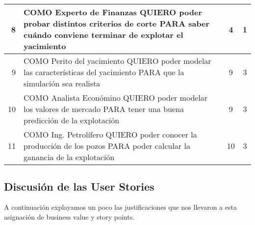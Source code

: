 \begin{center}
\begin{tabular}{| r | p{10cm} | c | c | }
    8 & COMO Experto de Finanzas QUIERO poder probar distintos criterios de corte PARA saber 
    cuándo conviene terminar de explotar el yacimiento & 4 & 1\\ \hline
    
    9 & COMO Perito del yacimiento QUIERO poder modelar las características del yacimiento PARA 
    que la simulación sea realista & 9 & 3\\ \hline
    
    10 & COMO Analista Económino QUIERO poder modelar los valores de mercado PARA 
    tener una buena predicción de la explotación & 9 & 3\\ \hline
    
    11 & COMO Ing. Petrolífero QUIERO poder conocer la producción de los pozos PARA poder calcular 
    la ganancia de la explotación & 10 & 3\\ \hline
    
  \end{tabular}
\end{center}

\subsection{Discusión de las User Stories}

A continuación explayamos un poco las justificaciones que nos llevaron a esta asignación de business value y story points.

